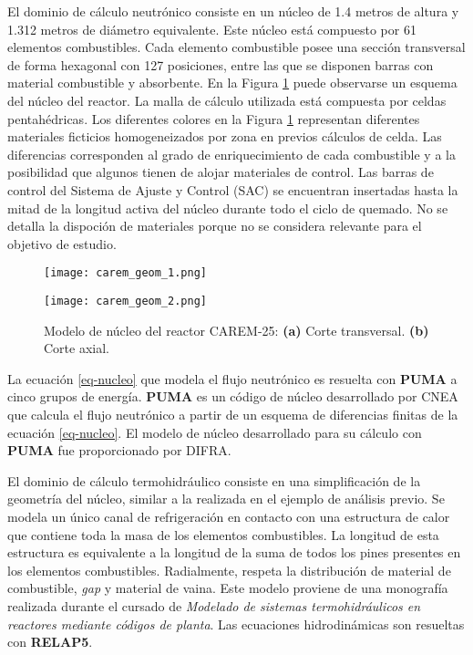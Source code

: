 El dominio de cálculo neutrónico consiste en un núcleo de 1.4 metros de altura y 1.312 metros de diámetro equivalente.
Este núcleo está compuesto por 61 elementos combustibles.
Cada elemento combustible posee una sección transversal de forma hexagonal con 127 posiciones, entre las que se disponen barras con material combustible y absorbente.
En la Figura \ref{carem_geom} puede observarse un esquema del núcleo del reactor.
La malla de cálculo utilizada está compuesta por celdas pentahédricas.
Los diferentes colores en la Figura \ref{carem_geom} representan diferentes materiales ficticios homogeneizados por zona en previos cálculos de celda.
Las diferencias corresponden al grado de enriquecimiento de cada combustible y a la posibilidad que algunos tienen de alojar materiales de control.
Las barras de control del Sistema de Ajuste y Control (SAC) se encuentran insertadas hasta la mitad de la longitud activa del núcleo durante todo el ciclo de quemado.
No se detalla la dispoción de materiales porque no se considera relevante para el objetivo de estudio.

\begin{figure}[ht]
	\begin{minipage}{0.5\linewidth}
		\centering
		\texttt{[image: carem\_geom\_1.png]}
	\end{minipage}
	\begin{minipage}{0.5\linewidth}
		\centering
		\texttt{[image: carem\_geom\_2.png]}
	\end{minipage}
\caption[Modelo de núcleo del reactor CAREM-25]
{Modelo de núcleo del reactor CAREM-25:
\textbf{(a)} Corte transversal.
\textbf{(b)} Corte axial.
}
\label{carem_geom}
\end{figure}
La ecuación \ref{eq-nucleo} que modela el flujo neutrónico es resuelta con \textbf{PUMA} \cite{puma} a cinco grupos de energía.
\textbf{PUMA} es un código de núcleo desarrollado por CNEA que calcula el flujo neutrónico a partir de un esquema de diferencias finitas de la ecuación \ref{eq-nucleo}.
El modelo de núcleo desarrollado para su cálculo con \textbf{PUMA} fue proporcionado por DIFRA.

El dominio de cálculo termohidráulico consiste en una simplificación de la geometría del núcleo, similar a la realizada en el ejemplo de análisis previo.
Se modela un único canal de refrigeración en contacto con una estructura de calor que contiene toda la masa de los elementos combustibles.
La longitud de esta estructura es equivalente a la longitud de la suma de todos los pines presentes en los elementos combustibles.
Radialmente, respeta la distribución de material de combustible, \textit{gap} y material de vaina.
Este modelo proviene de una monografía \cite{relap-carem} realizada durante el cursado de \textit{Modelado de sistemas termohidráulicos en reactores mediante códigos de planta}.
Las ecuaciones hidrodinámicas son resueltas con \textbf{RELAP5}.

